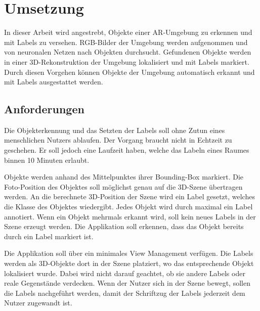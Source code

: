 \newpage
\section{Umsetzung}

In dieser Arbeit wird angestrebt, Objekte einer AR-Umgebung zu erkennen und mit Labels zu versehen.  RGB-Bilder der Umgebung werden aufgenommen und von neuronalen Netzen nach Objekten durchsucht. Gefundenen Objekte werden in einer 3D-Rekonstruktion der Umgebung lokalisiert und mit Labels markiert. Durch diesen Vorgehen können Objekte der Umgebung automatisch erkannt und mit Labels ausgestattet werden.

\subsection{Anforderungen}
Die Objekterkennung und das Setzten der Labels soll ohne Zutun eines menschlichen Nutzers ablaufen. Der Vorgang braucht nicht in Echtzeit zu geschehen. Er soll jedoch eine Laufzeit haben, welche das Labeln eines Raumes binnen 10 Minuten erlaubt.

Objekte werden anhand des Mittelpunktes ihrer Bounding-Box markiert. Die Foto-Position des Objektes soll möglichst genau auf die 3D-Szene übertragen werden. An die berechnete 3D-Position der Szene wird ein Label gesetzt, welches die Klasse des Objektes wiedergibt. Jedes Objekt wird durch maximal ein Label annotiert. Wenn ein Objekt mehrmals erkannt wird, soll kein neues Labels in der Szene erzeugt werden. Die Applikation soll erkennen, dass das Objekt bereits durch ein Label markiert ist.

Die Applikation soll über ein minimales View Management verfügen. Die Labels werden als 3D-Objekte dort in der Szene platziert, wo das entsprechende Objekt lokalisiert wurde. Dabei wird nicht darauf geachtet, ob sie andere Labels oder reale Gegenstände verdecken. Wenn der Nutzer sich in der Szene bewegt, sollen die Labels nachgeführt werden, damit der Schriftzug der Labels jederzeit dem Nutzer zugewandt ist.


